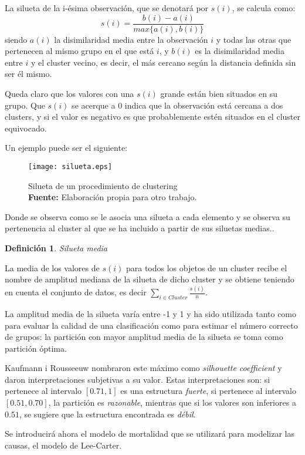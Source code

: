 \documentclass{article}
\newtheorem*{defi} {Definición}
\begin{document}
La silueta de la i-ésima observación, que se denotará por $s(i)$, se calcula como:
$$
s(i)=\frac{b(i)-a(i)}{max\{a(i),b(i)\}}
$$
siendo $a(i)$ la disimilaridad media entre la observación $i$ y todas las otras que pertenecen al mismo grupo en el que está $i$, y $b(i)$ es la disimilaridad media entre $i$ y el cluster vecino, es decir, el más cercano según la distancia definida sin ser él mismo.

Queda claro que los valores con una $s(i)$ grande están bien situados en su grupo. Que $s(i)$ se acerque a 0 indica que la observación está cercana a dos clusters, y si el valor es negativo es que probablemente estén situados en el cluster equivocado.

Un ejemplo puede ser el siguiente:

\begin{figure}[H]
\centering
\texttt{[image: silueta.eps]}
\caption{\centering Silueta de un procedimiento de clustering \\ \textbf{Fuente:} Elaboración propia para otro trabajo.}
\end{figure}

Donde se observa como se le asocia una silueta a cada elemento y se observa su pertenencia al cluster al que se ha incluido a partir de sus siluetas medias..
\begin{defi} Silueta media
\end{defi}

La media de los valores de $s(i)$ para todos los objetos de un cluster recibe el nombre de amplitud mediana de la silueta de dicho cluster y se obtiene teniendo en cuenta el conjunto de datos, es decir $\sum_{i \in Cluster}\frac{s(i)}{n}$.

La amplitud media de la silueta varía entre -1 y 1 y ha sido utilizada tanto como para evaluar la calidad de una clasificación como para estimar el número correcto de grupos: la partición con mayor amplitud media de la silueta se toma como partición óptima.


Kaufmann i Rousseeuw nombraron este máximo como \emph{silhouette coefficient} y daron interpretaciones subjetivas a su valor. Estas interpretaciones son: si pertenece al intervalo $[0.71,1]$ es una estructura \emph{fuerte}, si pertenece al intervalo $[0.51,0.70]$, la partición es \emph{razonable}, mientras que si los valores son inferiores a $0.51$, se sugiere que la estructura encontrada es \emph{débil}.


Se introducirá ahora el modelo de mortalidad que se utilizará para modelizar las causas, el modelo de Lee-Carter.
\end{document}
